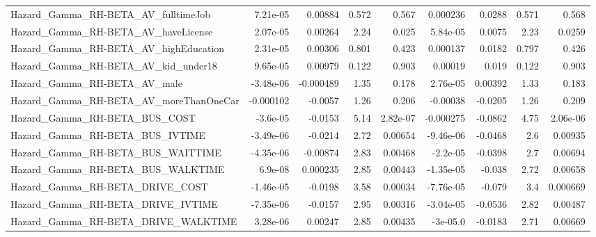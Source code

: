 \begin{tabular}{lrrrrrrrr}
Hazard\_Gamma\_RH-BETA\_AV\_fulltimeJob                &    7.21e-05 &      0.00884 &    0.572 &    0.567 &   0.000236 &      0.0288 &        0.571 &         0.568 \\
Hazard\_Gamma\_RH-BETA\_AV\_haveLicense                &    2.07e-05 &      0.00264 &     2.24 &    0.025 &   5.84e-05 &      0.0075 &         2.23 &        0.0259 \\
Hazard\_Gamma\_RH-BETA\_AV\_highEducation              &    2.31e-05 &      0.00306 &    0.801 &    0.423 &   0.000137 &      0.0182 &        0.797 &         0.426 \\
Hazard\_Gamma\_RH-BETA\_AV\_kid\_under18                &    9.65e-05 &      0.00979 &    0.122 &    0.903 &    0.00019 &       0.019 &        0.122 &         0.903 \\
Hazard\_Gamma\_RH-BETA\_AV\_male                       &   -3.48e-06 &    -0.000489 &     1.35 &    0.178 &   2.76e-05 &     0.00392 &         1.33 &         0.183 \\
Hazard\_Gamma\_RH-BETA\_AV\_moreThanOneCar             &   -0.000102 &      -0.0057 &     1.26 &    0.206 &   -0.00038 &     -0.0205 &         1.26 &         0.209 \\
Hazard\_Gamma\_RH-BETA\_BUS\_COST                      &    -3.6e-05 &      -0.0153 &     5.14 & 2.82e-07 &  -0.000275 &     -0.0862 &         4.75 &      2.06e-06 \\
Hazard\_Gamma\_RH-BETA\_BUS\_IVTIME                    &   -3.49e-06 &      -0.0214 &     2.72 &  0.00654 &  -9.46e-06 &     -0.0468 &          2.6 &       0.00935 \\
Hazard\_Gamma\_RH-BETA\_BUS\_WAITTIME                  &   -4.35e-06 &     -0.00874 &     2.83 &  0.00468 &   -2.2e-05 &     -0.0398 &          2.7 &       0.00694 \\
Hazard\_Gamma\_RH-BETA\_BUS\_WALKTIME                  &     6.9e-08 &     0.000235 &     2.85 &  0.00443 &  -1.35e-05 &      -0.038 &         2.72 &       0.00658 \\
Hazard\_Gamma\_RH-BETA\_DRIVE\_COST                    &   -1.46e-05 &      -0.0198 &     3.58 &  0.00034 &  -7.76e-05 &      -0.079 &          3.4 &      0.000669 \\
Hazard\_Gamma\_RH-BETA\_DRIVE\_IVTIME                  &   -7.35e-06 &      -0.0157 &     2.95 &  0.00316 &  -3.04e-05 &     -0.0536 &         2.82 &       0.00487 \\
Hazard\_Gamma\_RH-BETA\_DRIVE\_WALKTIME                &    3.28e-06 &      0.00247 &     2.85 &  0.00435 &   -3e-05.0 &     -0.0183 &         2.71 &       0.00669 \\

\end{tabular}

